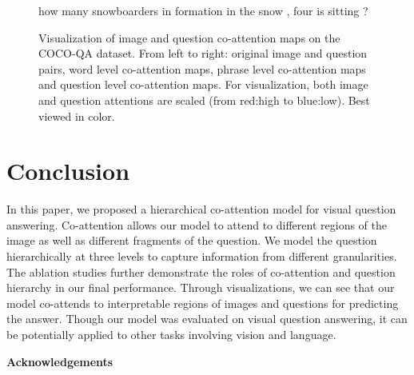 \documentclass{article}
\def \fsize {1pt}
\begin{document}
\begin{figure}[tb]
\begin{minipage}{0.22\linewidth}
\begin{center}
\tiny{
\setlength{\fboxsep}{\fsize}
\textcolor[rgb]{0.0000,0.6294,1.0000}{how}
\textcolor[rgb]{0.0000,0.6137,1.0000}{many}
\textcolor[rgb]{0.0000,0.6137,1.0000}{snowboarders}
\textcolor[rgb]{0.0000,0.6137,1.0000}{in}
\textcolor[rgb]{0.0000,0.5667,1.0000}{formation}
\textcolor[rgb]{0.0000,0.5667,1.0000}{in}
\textcolor[rgb]{0.0000,0.5980,1.0000}{the}
\textcolor[rgb]{0.0000,0.6137,1.0000}{snow}
\textcolor[rgb]{0.0000,0.6137,1.0000}{,}
\textcolor[rgb]{0.0000,0.6137,1.0000}{four}
\textcolor[rgb]{0.0000,0.5667,1.0000}{is}
\textcolor[rgb]{0.0000,0.6137,1.0000}{sitting}
\textcolor[rgb]{0.0000,0.5980,1.0000}{?}
}
\end{center}
\end{minipage}
\caption{Visualization of image and question co-attention maps on the COCO-QA dataset. From left to right: original image and question pairs, word level co-attention maps, phrase level co-attention maps and question level co-attention maps. For visualization, both image and question attentions are scaled (from red:high to blue:low). Best viewed in color.}
\label{fig:vis}
\end{figure} \section{Conclusion}
\label{sec:con}
\vspace*{-2mm}
In this paper, we proposed a hierarchical co-attention model for visual question answering. Co-attention allows our model to attend to different regions of the image as well as different fragments of the question. We model the question hierarchically at three levels to capture information from different granularities. The ablation studies further demonstrate the roles of co-attention and question hierarchy in our final performance. Through visualizations, we can see that our model co-attends to interpretable regions of images and questions for predicting the answer. Though our model was evaluated on visual question answering, it can be potentially applied to other tasks involving vision and language.


\small{\textbf{Acknowledgements}}
\end{document}
